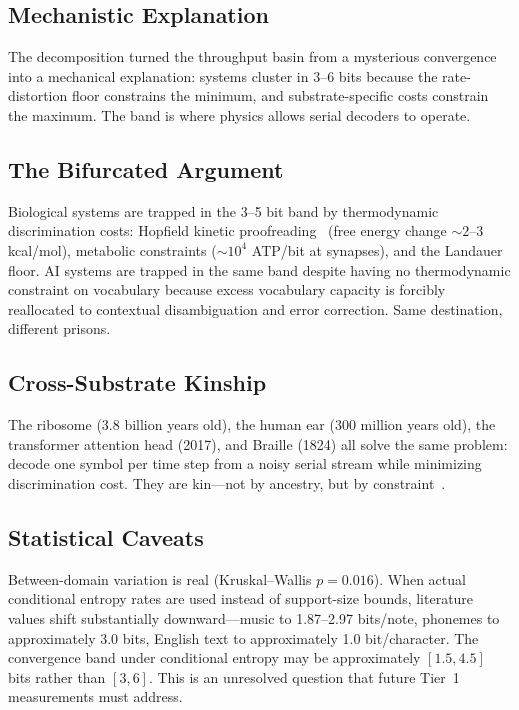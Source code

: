 \documentclass[11pt]{article}
\begin{document}
\subsection{Mechanistic Explanation}

The decomposition turned the throughput basin from a mysterious convergence into a mechanical explanation: systems cluster in 3--6 bits because the rate-distortion floor constrains the minimum, and substrate-specific costs constrain the maximum. The band is where physics allows serial decoders to operate.

\subsection{The Bifurcated Argument}

Biological systems are trapped in the 3--5 bit band by thermodynamic discrimination costs: Hopfield kinetic proofreading~\cite{hopfield1974} (free energy change $\sim 2$--3 kcal/mol), metabolic constraints ($\sim 10^4$ ATP/bit at synapses), and the Landauer floor. AI systems are trapped in the same band despite having no thermodynamic constraint on vocabulary because excess vocabulary capacity is forcibly reallocated to contextual disambiguation and error correction. Same destination, different prisons.

\subsection{Cross-Substrate Kinship}

The ribosome (3.8 billion years old), the human ear (300 million years old), the transformer attention head (2017), and Braille (1824) all solve the same problem: decode one symbol per time step from a noisy serial stream while minimizing discrimination cost. They are kin---not by ancestry, but by constraint~\cite{whitmer2026fons}.

\subsection{Statistical Caveats}

Between-domain variation is real (Kruskal--Wallis $p = 0.016$). When actual conditional entropy rates are used instead of support-size bounds, literature values shift substantially downward---music to 1.87--2.97 bits/note, phonemes to approximately 3.0 bits, English text to approximately 1.0 bit/character. The convergence band under conditional entropy may be approximately $[1.5, 4.5]$ bits rather than $[3, 6]$. This is an unresolved question that future Tier~1 measurements must address.
\end{document}
